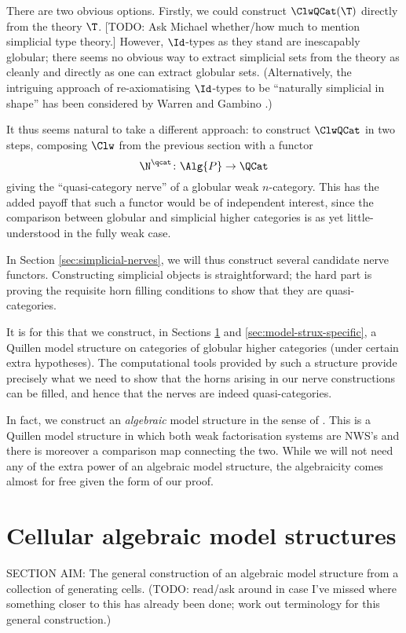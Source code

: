 There are two obvious options.  Firstly, we could construct $\ClwQCat(\T)$ directly from the theory $\T$.  [TODO: Ask Michael whether/how much to mention simplicial type theory.]  However, $\Id$-types as they stand are inescapably globular; there seems no obvious way to extract simplicial sets from the theory as cleanly and directly as one can extract globular sets.  (Alternatively, the intriguing approach of re-axiomatising $\Id$-types to be ``naturally simplicial in shape'' has been considered by Warren and Gambino \cite{??}.)

It thus seems natural to take a different approach: to construct $\ClwQCat$ in two steps, composing $\Clw$ from the previous section with a functor
$$ \N^\qcat \colon \Alg{P} \to \QCat $$
giving the ``quasi-category nerve'' of a globular weak $n$-category.  This has the added payoff that such a functor would be of independent interest, since the comparison between globular and simplicial higher categories is as yet little-understood in the fully weak case.

\para In Section \ref{sec:simplicial-nerves}, we will thus construct several candidate nerve functors.  Constructing simplicial objects is straightforward; the hard part is proving the requisite horn filling conditions to show that they are quasi-categories.

It is for this that we construct, in Sections \ref{sec:model-strux-general} and \ref{sec:model-strux-specific}, a Quillen model structure on categories of globular higher categories (under certain extra hypotheses).   The computational tools provided by such a structure provide precisely what we need to show that the horns arising in our nerve constructions can be filled, and hence that the nerves are indeed quasi-categories.

In fact, we construct an \emph{algebraic} model structure in the sense of \cite{riehl:alg-mod-strux}.  This is a Quillen model structure in which both weak factorisation systems are NWS's and there is moreover a comparison map connecting the two.  While we will not need any of the extra power of an algebraic model structure, the algebraicity comes almost for free given the form of our proof.

\section{Cellular algebraic model structures} \label{sec:model-strux-general}

SECTION AIM: The general construction of an algebraic model structure from a collection of generating cells.  (TODO: read/ask around in case I've missed where something closer to this has already been done; work out terminology for this general construction.)

